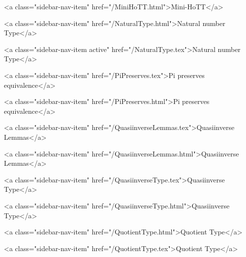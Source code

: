       
        
          <a class="sidebar-nav-item" href="/MiniHoTT.html">Mini-HoTT</a>
        
      
    
      
        
          <a class="sidebar-nav-item" href="/NaturalType.html">Natural number Type</a>
        
      
    
      
        
          <a class="sidebar-nav-item active" href="/NaturalType.tex">Natural number Type</a>
        
      
    
      
        
          <a class="sidebar-nav-item" href="/PiPreserves.tex">Pi preserves equivalence</a>
        
      
    
      
        
          <a class="sidebar-nav-item" href="/PiPreserves.html">Pi preserves equivalence</a>
        
      
    
      
        
          <a class="sidebar-nav-item" href="/QuasiinverseLemmas.tex">Quasiinverse Lemmas</a>
        
      
    
      
        
          <a class="sidebar-nav-item" href="/QuasiinverseLemmas.html">Quasiinverse Lemmas</a>
        
      
    
      
        
          <a class="sidebar-nav-item" href="/QuasiinverseType.tex">Quasiinverse Type</a>
        
      
    
      
        
          <a class="sidebar-nav-item" href="/QuasiinverseType.html">Quasiinverse Type</a>
        
      
    
      
        
          <a class="sidebar-nav-item" href="/QuotientType.html">Quotient Type</a>
        
      
    
      
        
          <a class="sidebar-nav-item" href="/QuotientType.tex">Quotient Type</a>
        
